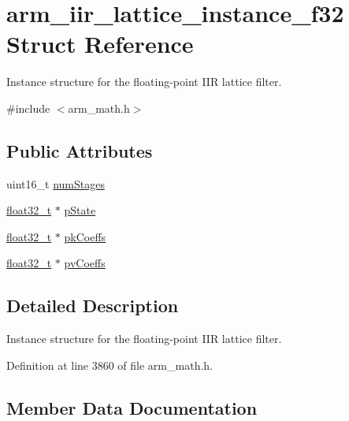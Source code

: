 \hypertarget{structarm__iir__lattice__instance__f32}{}\section{arm\+\_\+iir\+\_\+lattice\+\_\+instance\+\_\+f32 Struct Reference}
\label{structarm__iir__lattice__instance__f32}


Instance structure for the floating-\/point I\+IR lattice filter.  




{\ttfamily \#include $<$arm\+\_\+math.\+h$>$}

\subsection*{Public Attributes}
\begin{DoxyCompactItemize}
\item 
uint16\+\_\+t \hyperlink{structarm__iir__lattice__instance__f32_af8de449af5efe1f30be82f9ba35587ee}{num\+Stages}
\item 
\hyperlink{arm__math_8h_a4611b605e45ab401f02cab15c5e38715}{float32\+\_\+t} $\ast$ \hyperlink{structarm__iir__lattice__instance__f32_a30babe7815510219e6e3d28e6e4a5969}{p\+State}
\item 
\hyperlink{arm__math_8h_a4611b605e45ab401f02cab15c5e38715}{float32\+\_\+t} $\ast$ \hyperlink{structarm__iir__lattice__instance__f32_aa69fcdd3775e828d450ce1bbd978fa31}{pk\+Coeffs}
\item 
\hyperlink{arm__math_8h_a4611b605e45ab401f02cab15c5e38715}{float32\+\_\+t} $\ast$ \hyperlink{structarm__iir__lattice__instance__f32_afc7c8f577e6f27d097fe55f57e707f72}{pv\+Coeffs}
\end{DoxyCompactItemize}


\subsection{Detailed Description}
Instance structure for the floating-\/point I\+IR lattice filter. 

Definition at line 3860 of file arm\+\_\+math.\+h.



\subsection{Member Data Documentation}
\mbox{\label{structarm__iir__lattice__instance__f32_af8de449af5efe1f30be82f9ba35587ee}} 
